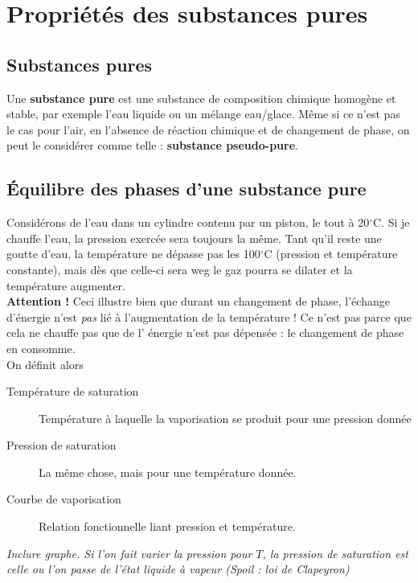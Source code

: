 \chapter{Propriétés des substances pures} 
\section{Substances pures}
Une \textbf{substance pure} est une substance de composition chimique 
homogène et stable, par exemple l'eau liquide ou un mélange eau/glace. 
Même si ce n'est pas le cas pour l'air, en l'absence de réaction 
chimique et de changement de phase, on peut le considérer comme telle 
: \textbf{substance pseudo-pure}.

\section{Équilibre des phases d'une substance pure}
Considérons de l'eau dans un cylindre contenu par un piston, le tout à 
20$^\circ$C. Si je chauffe l'eau, la pression exercée sera toujours la 
même. Tant qu'il reste une goutte d'eau, la température ne dépasse pas 
les 100$^\circ$C (pression et température constante), mais dès que 
celle-ci sera weg le gaz pourra se dilater et la température augmenter.\\

\noindent
\textbf{Attention !} Ceci illustre bien que durant un changement de 
phase, l'échange d'énergie n'est \textit{pas} lié à l'augmentation de 
la température ! Ce n'est pas parce que cela ne chauffe pas que de l'
énergie n'est pas dépensée : le changement de phase en consomme.\\
On définit alors
\begin{description}
\item[Température de saturation] Température à laquelle la vaporisation 
se produit pour une pression donnée
\item[Pression de saturation] La même chose, mais pour une température 
donnée.
\item[Courbe de vaporisation] Relation fonctionnelle liant pression et 
température.
\end{description}

\begin{center}
\textit{Inclure graphe. Si l'on fait varier la pression pour $T$, la 
pression de saturation est celle ou l'on passe de l'état liquide à 
vapeur (Spoil : loi de Clapeyron)}
\end{center}

